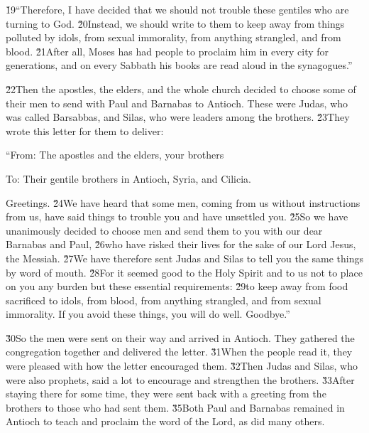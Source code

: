 \v{19}``Therefore, I have decided that we should not trouble these gentiles who are turning to God. \v{20}Instead, we should write to them to keep away from things polluted by idols, from sexual immorality, from anything strangled, and from blood. \v{21}After all, Moses has had people to proclaim him in every city for generations, and on every Sabbath his books are read aloud in the synagogues.''

\v{22}Then the apostles, the elders, and the whole church decided to choose some of their men to send with Paul and Barnabas to Antioch. These were Judas, who was called Barsabbas, and Silas, who were leaders among the brothers. \v{23}They wrote this letter for them to deliver:

``From: The apostles and the elders, your brothers

To: Their gentile brothers in Antioch, Syria, and Cilicia.

Greetings. \v{24}We have heard that some men, coming from us without instructions from us, have said things to trouble you and have unsettled you. \v{25}So we have unanimously decided to choose men and send them to you with our dear Barnabas and Paul, \v{26}who have risked their lives for the sake of our Lord Jesus, the Messiah. \v{27}We have therefore sent Judas and Silas to tell you the same things by word of mouth. \v{28}For it seemed good to the Holy Spirit and to us not to place on you any burden but these essential requirements: \v{29}to keep away from food sacrificed to idols, from blood, from anything strangled, and from sexual immorality. If you avoid these things, you will do well. Goodbye.''

\v{30}So the men were sent on their way and arrived in Antioch. They gathered the congregation together and delivered the letter. \v{31}When the people read it, they were pleased with how the letter encouraged them. \v{32}Then Judas and Silas, who were also prophets, said a lot to encourage and strengthen the brothers. \v{33}After staying there for some time, they were sent back with a greeting from the brothers to those who had sent them. \v{35}Both Paul and Barnabas remained in Antioch to teach and proclaim the word of the Lord, as did many others.

